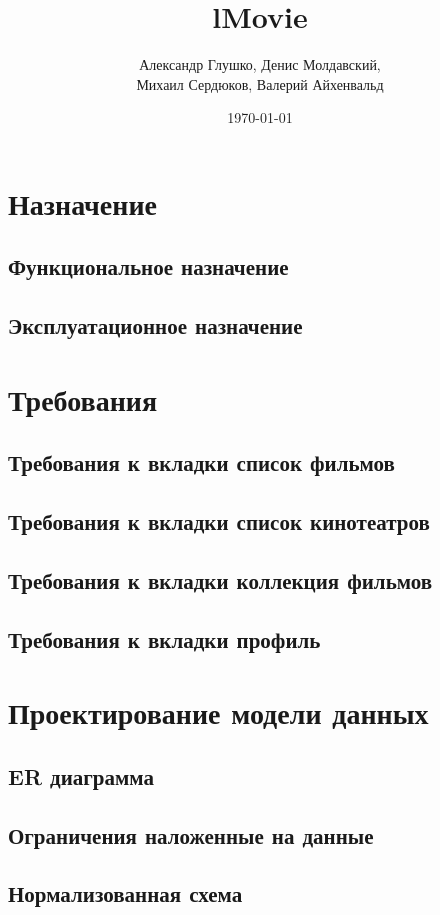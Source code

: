 \documentclass[a4paper,16pt]{article}
\title{lMovie}
\author{Александр Глушко, Денис Молдавский, \\ Михаил Сердюков, Валерий Айхенвальд}
\date{\today}
\begin{document}
\maketitle
\tableofcontents
\newpage

\section{Назначение}
\subsection{Функциональное назначение}
\subsection{Эксплуатационное назначение}


\section{Требования}
\subsection{Требования к вкладки список фильмов}
\subsection{Требования к вкладки список кинотеатров}
\subsection{Требования к вкладки коллекция фильмов}
\subsection{Требования к вкладки профиль}

\section{Проектирование модели данных}
\subsection{ER диаграмма}
\subsection{Ограничения наложенные на данные}
\subsection{Нормализованная схема}
\end{document}
